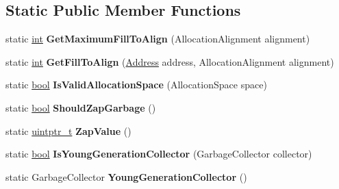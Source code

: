 \subsection*{Static Public Member Functions}
\begin{DoxyCompactItemize}
\item 
\mbox{\label{classv8_1_1internal_1_1Heap_aa15cca2d6265fd11e04ca74439f1e411}} 
static \mbox{\hyperlink{classint}{int}} {\bfseries Get\+Maximum\+Fill\+To\+Align} (Allocation\+Alignment alignment)
\item 
\mbox{\label{classv8_1_1internal_1_1Heap_ad2b3529d1ff4aad404b8c49460f02541}} 
static \mbox{\hyperlink{classint}{int}} {\bfseries Get\+Fill\+To\+Align} (\mbox{\hyperlink{classuintptr__t}{Address}} address, Allocation\+Alignment alignment)
\item 
\mbox{\label{classv8_1_1internal_1_1Heap_a6198fff861e1168b5e47456fffe8e676}} 
static \mbox{\hyperlink{classbool}{bool}} {\bfseries Is\+Valid\+Allocation\+Space} (Allocation\+Space space)
\item 
\mbox{\label{classv8_1_1internal_1_1Heap_ac19479ef877d178e26d2f34f56cda336}} 
static \mbox{\hyperlink{classbool}{bool}} {\bfseries Should\+Zap\+Garbage} ()
\item 
\mbox{\label{classv8_1_1internal_1_1Heap_a3fdf978e94d8baa04888b0fcbde68347}} 
static \mbox{\hyperlink{classuintptr__t}{uintptr\+\_\+t}} {\bfseries Zap\+Value} ()
\item 
\mbox{\label{classv8_1_1internal_1_1Heap_a262cc1519aa529fb23c6da95ecd78521}} 
static \mbox{\hyperlink{classbool}{bool}} {\bfseries Is\+Young\+Generation\+Collector} (Garbage\+Collector collector)
\item 
\mbox{\label{classv8_1_1internal_1_1Heap_a40b8b10fb0011d348c4c3743a4242086}} 
static Garbage\+Collector {\bfseries Young\+Generation\+Collector} ()
\item 
\mbox{\label{classv8_1_1internal_1_1Heap_ad9a2ed6569059f4585da19f240f82e7c}} 

\end{DoxyCompactItemize}
